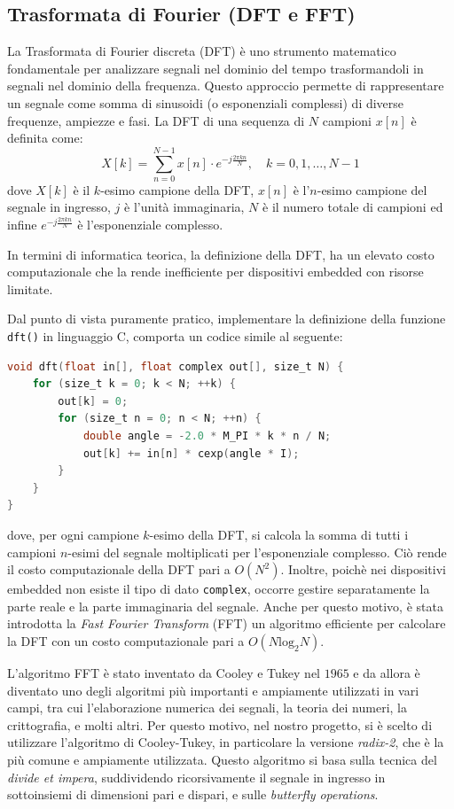 \documentclass[a4paper,12pt]{report}  %
\newcommand{\lstinlinebg}[1]{\colorbox{backcolour}{\lstinline|#1|}}
\begin{document}
\subsection{Trasformata di Fourier (DFT e FFT)}\label{sec:fft}
La Trasformata di Fourier discreta (DFT) è uno strumento matematico fondamentale per analizzare segnali nel dominio del tempo trasformandoli in segnali nel dominio della frequenza.
Questo approccio permette di rappresentare un segnale come somma di sinusoidi (o esponenziali complessi) di diverse frequenze, ampiezze e fasi.
La DFT di una sequenza di $N$ campioni $x[n]$ è definita come:
\begin{equation}
    X[k] = \sum_{n = 0}^{N - 1} x[n] \cdot e^{-j \frac{2 \pi k n}{N}}, \quad k = 0, 1, \ldots, N - 1 \nonumber
\end{equation}
dove $X[k]$ è il $k$-esimo campione della DFT, $x[n]$ è l'$n$-esimo campione del segnale in ingresso, $j$ è l'unità immaginaria, $N$ è il numero totale di campioni ed infine $e^{-j \frac{2 \pi k n}{N}}$ è l'esponenziale complesso.

In termini di informatica teorica, la definizione della DFT, ha un elevato costo computazionale che la rende inefficiente per dispositivi embedded con risorse limitate.

Dal punto di vista puramente pratico, implementare la definizione della funzione \lstinlinebg{dft()} in linguaggio C, comporta un codice simile al seguente:
\begin{lstlisting}[language=C,keywords={void, complex, float, size_t, for, double, cexp, I, M_PI}]
void dft(float in[], float complex out[], size_t N) {
    for (size_t k = 0; k < N; ++k) {
        out[k] = 0;
        for (size_t n = 0; n < N; ++n) {
            double angle = -2.0 * M_PI * k * n / N;
            out[k] += in[n] * cexp(angle * I);
        }
    }
}
\end{lstlisting}
dove, per ogni campione $k$-esimo della DFT, si calcola la somma di tutti i campioni $n$-esimi del segnale moltiplicati per l'esponenziale complesso.
Ciò rende il costo computazionale della DFT pari a $O(N^2)$.
Inoltre, poichè nei dispositivi embedded non esiste il tipo di dato \lstinlinebg{complex}, occorre gestire separatamente la parte reale e la parte immaginaria del segnale.
Anche per questo motivo, è stata introdotta la \textit{Fast Fourier Transform} (FFT) un algoritmo efficiente per calcolare la DFT con un costo computazionale pari a $O(N \text{log}_2 N)$.

L'algoritmo FFT è stato inventato da Cooley e Tukey nel $1965$ e da allora è diventato uno degli algoritmi più importanti e ampiamente utilizzati in vari campi, tra cui l'elaborazione numerica dei segnali, la teoria dei numeri, la crittografia, e molti altri.
Per questo motivo, nel nostro progetto, si è scelto di utilizzare l'algoritmo di Cooley-Tukey, in particolare la versione \textit{radix-2}, che è la più comune e ampiamente utilizzata.
Questo algoritmo si basa sulla tecnica del \textit{divide et impera}, suddividendo ricorsivamente il segnale in ingresso in sottoinsiemi di dimensioni pari e dispari, e sulle \textit{butterfly operations}.
\end{document}
